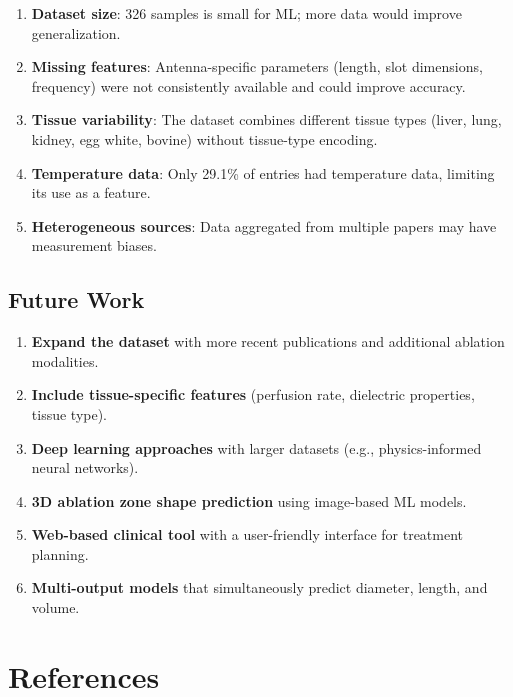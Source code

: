 \documentclass[12pt, a4paper]{article}
\begin{document}
\begin{enumerate}
    \item \textbf{Dataset size}: 326 samples is small for ML; more data would improve generalization.
    \item \textbf{Missing features}: Antenna-specific parameters (length, slot dimensions, frequency) were not consistently available and could improve accuracy.
    \item \textbf{Tissue variability}: The dataset combines different tissue types (liver, lung, kidney, egg white, bovine) without tissue-type encoding.
    \item \textbf{Temperature data}: Only 29.1\% of entries had temperature data, limiting its use as a feature.
    \item \textbf{Heterogeneous sources}: Data aggregated from multiple papers may have measurement biases.
\end{enumerate}

\subsection{Future Work}
\label{sec:future-work}

\begin{enumerate}
    \item \textbf{Expand the dataset} with more recent publications and additional ablation modalities.
    \item \textbf{Include tissue-specific features} (perfusion rate, dielectric properties, tissue type).
    \item \textbf{Deep learning approaches} with larger datasets (e.g., physics-informed neural networks).
    \item \textbf{3D ablation zone shape prediction} using image-based ML models.
    \item \textbf{Web-based clinical tool} with a user-friendly interface for treatment planning.
    \item \textbf{Multi-output models} that simultaneously predict diameter, length, and volume.
\end{enumerate}

\section{References}
\label{sec:references}
\end{document}
